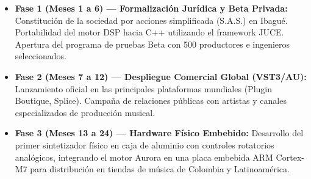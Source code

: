\documentclass[11pt,a4paper]{article}
\begin{document}
\begin{itemize}[leftmargin=1.5cm]
    \item \textbf{Fase 1 (Meses 1 a 6) — Formalización Jurídica y Beta Privada:}
    Constitución de la sociedad por acciones simplificada (S.A.S.) en Ibagué. Portabilidad del motor DSP hacia C++ utilizando el framework JUCE. Apertura del programa de pruebas Beta con 500 productores e ingenieros seleccionados.
    \item \textbf{Fase 2 (Meses 7 a 12) — Despliegue Comercial Global (VST3/AU):}
    Lanzamiento oficial en las principales plataformas mundiales (Plugin Boutique, Splice). Campaña de relaciones públicas con artistas y canales especializados de producción musical.
    \item \textbf{Fase 3 (Meses 13 a 24) — Hardware Físico Embebido:}
    Desarrollo del primer sintetizador físico en caja de aluminio con controles rotatorios analógicos, integrando el motor Aurora en una placa embebida ARM Cortex-M7 para distribución en tiendas de música de Colombia y Latinoamérica.
\end{itemize}
\end{document}
